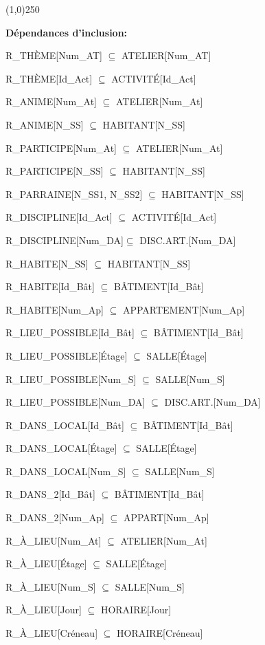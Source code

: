 \documentclass[a4paper,10.5pt]{report}
\begin{document}
	\begin{center}
	\line(1,0){250}
	\end{center}

	\textbf{Dépendances d'inclusion:}

	
	R\_THÈME[Num\_AT] $\subseteq$ ATELIER[Num\_AT]

	R\_THÈME[Id\_Act] $\subseteq$ ACTIVITÉ[Id\_Act]

	R\_ANIME[Num\_At] $\subseteq$ ATELIER[Num\_At]

	R\_ANIME[N\_SS] $\subseteq$ HABITANT[N\_SS]

	R\_PARTICIPE[Num\_At] $\subseteq$ ATELIER[Num\_At]

	R\_PARTICIPE[N\_SS] $\subseteq$ HABITANT[N\_SS]

	R\_PARRAINE[N\_SS1, N\_SS2] $\subseteq$ HABITANT[N\_SS]

	R\_DISCIPLINE[Id\_Act] $\subseteq$ ACTIVITÉ[Id\_Act]

	R\_DISCIPLINE[Num\_DA]$\subseteq$ DISC.ART.[Num\_DA]

	R\_HABITE[N\_SS] $\subseteq$ HABITANT[N\_SS]

	R\_HABITE[Id\_Bât] $\subseteq$ BÂTIMENT[Id\_Bât]

	R\_HABITE[Num\_Ap] $\subseteq$ APPARTEMENT[Num\_Ap]

	R\_LIEU\_POSSIBLE[Id\_Bât] $\subseteq$ BÂTIMENT[Id\_Bât]

	R\_LIEU\_POSSIBLE[Étage] $\subseteq$ SALLE[Étage]

	R\_LIEU\_POSSIBLE[Num\_S] $\subseteq$ SALLE[Num\_S]

	R\_LIEU\_POSSIBLE[Num\_DA] $\subseteq$ DISC.ART.[Num\_DA]

	R\_DANS\_LOCAL[Id\_Bât] $\subseteq$ BÂTIMENT[Id\_Bât]

	R\_DANS\_LOCAL[Étage] $\subseteq$ SALLE[Étage]

	R\_DANS\_LOCAL[Num\_S] $\subseteq$ SALLE[Num\_S]

	R\_DANS\_2[Id\_Bât] $\subseteq$ BÂTIMENT[Id\_Bât]

	R\_DANS\_2[Num\_Ap] $\subseteq$ APPART[Num\_Ap]

	R\_À\_LIEU[Num\_At] $\subseteq$ ATELIER[Num\_At]

	R\_À\_LIEU[Étage] $\subseteq$ SALLE[Étage]

	R\_À\_LIEU[Num\_S] $\subseteq$ SALLE[Num\_S]

	R\_À\_LIEU[Jour] $\subseteq$ HORAIRE[Jour]

	R\_À\_LIEU[Créneau] $\subseteq$ HORAIRE[Créneau]
	
\end{document}
